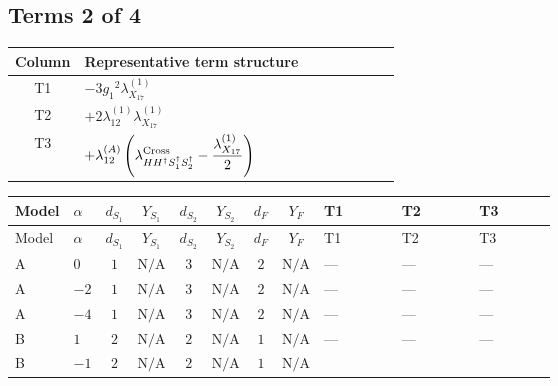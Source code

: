 \documentclass[8pt]{article}
\begin{document}
\begin{landscape}
\subsection*{Terms 2 of 4}
\begin{center}
\begin{tabular}{@{}c >{\raggedright\arraybackslash}p{0.82\linewidth}@{}}
\toprule
Column & Representative term structure \\
\midrule
T1 & \(\displaystyle -3 {g_1}^2 {\lambda_{X_{17}}^{(1)}}\) \\
\midrule
T2 & \(\displaystyle +2 {\lambda_{12}^{(1)}} {\lambda_{X_{17}}^{(1)}}\) \\
\midrule
T3 & \(\displaystyle +{\lambda_{12}^{(A)}} \left({\lambda_{H H^\dagger S_1^\dagger S_2^\dagger}^{\rm Cross}}-\frac{{\lambda_{X_{17}}^{(1)}}}{2}\right)\) \\
\midrule
\bottomrule
\end{tabular}
\end{center}
\smallskip
\tiny
\begin{longtable}{@{}llcccccc >{\raggedright\arraybackslash}p{0.21\linewidth} >{\raggedright\arraybackslash}p{0.21\linewidth} >{\raggedright\arraybackslash}p{0.21\linewidth}@{}}
\toprule
Model & $\alpha$ & $d_{S_1}$ & $Y_{S_1}$ & $d_{S_2}$ & $Y_{S_2}$ & $d_F$ & $Y_F$ & T1 & T2 & T3 \\
\midrule
\endfirsthead
\toprule
Model & $\alpha$ & $d_{S_1}$ & $Y_{S_1}$ & $d_{S_2}$ & $Y_{S_2}$ & $d_F$ & $Y_F$ & T1 & T2 & T3 \\
\midrule
\endhead
A & $0$ & $1$ & $\text{N/A}$ & $3$ & $\text{N/A}$ & $2$ & $\text{N/A}$ & --- & --- & --- \\
\midrule
A & $-2$ & $1$ & $\text{N/A}$ & $3$ & $\text{N/A}$ & $2$ & $\text{N/A}$ & --- & --- & --- \\
\midrule
A & $-4$ & $1$ & $\text{N/A}$ & $3$ & $\text{N/A}$ & $2$ & $\text{N/A}$ & --- & --- & --- \\
\midrule
B & $1$ & $2$ & $\text{N/A}$ & $2$ & $\text{N/A}$ & $1$ & $\text{N/A}$ & --- & --- & --- \\
\midrule
B & $-1$ & $2$ & $\text{N/A}$ & $2$ & $\text{N/A}$ & $1$ & $\text{N/A}$ & \scriptsize\adjustbox{max width=\linewidth}{$\begin{gathered} -3 {g_1}^2 {\lambda_{X_{17}}^{(1)}}\end{gathered}$} & \scriptsize\adjustbox{max width=\linewidth}{$\begin{gathered} +2 {\lambda_{12}^{(1)}} {\lambda_{X_{17}}^{(1)}}\end{gathered}$} & \scriptsize\adjustbox{max width=\linewidth}{$\begin{gathered} +{\lambda_{12}^{(A)}} \left({\lambda_{H H^\dagger S_1^\dagger S_2^\dagger}^{\rm Cross}}-\frac{{\lambda_{X_{17}}^{(1)}}}{2}\right)\end{gathered}$} \\

\end{longtable}
\end{landscape}
\end{document}
